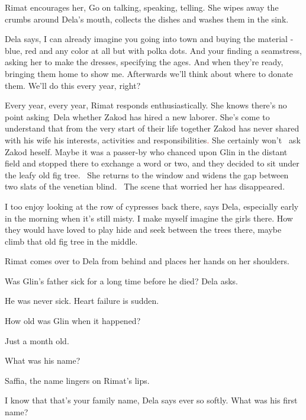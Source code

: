\documentclass[letterpaper]{article}
\begin{document}
Rimat encourages her, {\textquotedbl}Go on talking, speaking, telling.{\textquotedbl} She wipes away the crumbs around
Dela's mouth, collects the dishes and washes them in the sink. 

Dela says, {\textquotedbl}I can already imagine you going into town and buying the material - blue, red and any color at
all but with polka dots. And your finding a seamstress, asking her to make the dresses, specifying the ages. And when
they're ready, bringing them home to show me. Afterwards we'll think about where to donate them. We'll do this every
year, right?{\textquotedbl}

{\textquotedbl}Every year, every year,{\textquotedbl} Rimat responds enthusiastically. She knows there's no point
asking~Dela whether Zakod has hired a new laborer. She's come to understand that from the very start of their life
together Zakod has never shared with his wife his interests, activities and responsibilities\textcolor{red}{. }She
certainly won't \textcolor{red}{\ }ask Zakod heself. Maybe it was a passer-by who chanced upon Glin in the distant
field and stopped there to exchange a word or two, and they decided to sit under the\textcolor{red}{ }leafy old fig
tree. ~She returns to the window and widens the gap between two slats of the venetian blind. ~The scene that worried
her has disappeared. 

{\textquotedbl}I too enjoy looking at the row of cypresses back there,{\textquotedbl} says Dela,
{\textquotedbl}especially early in the morning when it's still misty. I make myself imagine the girls there. How they
would have loved to play hide and seek between the trees there, maybe climb that old fig tree in the
middle.{\textquotedbl}

Rimat comes over to Dela from behind and places her hands on her shoulders. 

{\textquotedbl}Was Glin's father sick for a long time before he died?{\textquotedbl} Dela asks.

{\textquotedbl}He was never sick. Heart failure is sudden.{\textquotedbl}

{\textquotedbl}How old was Glin when it happened?{\textquotedbl}

{\textquotedbl}Just a month old.{\textquotedbl}

{\textquotedbl}What was his name?{\textquotedbl}

{\textquotedbl}Saffia,{\textquotedbl} the name lingers on Rimat's lips.

{\textquotedbl}I know that that's your family name,{\textquotedbl} Dela says ever so softly. {\textquotedbl}What was his
first name?{\textquotedbl} 
\end{document}

